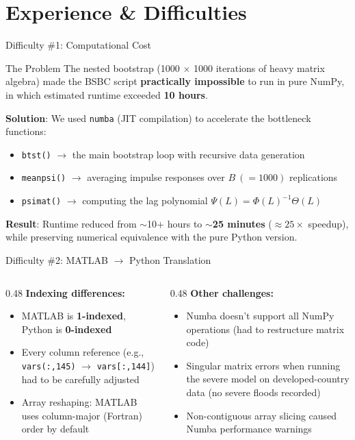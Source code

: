 \documentclass[10pt, aspectratio=169]{beamer}
\begin{document}
\section{Experience \& Difficulties}

\begin{frame}{Difficulty \#1: Computational Cost}
\begin{alertblock}{The Problem}
The nested bootstrap (1000 $\times$ 1000 iterations of heavy matrix algebra) made the BSBC script \textbf{practically impossible} to run in pure NumPy, in which estimated runtime exceeded \textbf{10 hours}.
\end{alertblock}

\vspace{0.3em}
\textbf{Solution}: We used \texttt{numba} (JIT compilation) to accelerate the bottleneck functions:
\begin{itemize}
    \item \texttt{btst()} $\rightarrow$ the main bootstrap loop with recursive data generation
    \item \texttt{meanpsi()} $\rightarrow$ averaging impulse responses over $B\ (=1000)$ replications
    \item \texttt{psimat()} $\rightarrow$ computing the lag polynomial $\Psi(L) = \Phi(L)^{-1}\Theta(L)$
\end{itemize}

\vspace{0.3em}
\textbf{Result}: Runtime reduced from $\sim$10+ hours to $\sim$\textbf{25 minutes} ($\approx 25\times$ speedup), while preserving numerical equivalence with the pure Python version.
\end{frame}

\begin{frame}{Difficulty \#2: MATLAB $\rightarrow$ Python Translation}
\begin{columns}
\begin{column}{0.48\textwidth}
\textbf{Indexing differences:}
\begin{itemize}
    \item MATLAB is \textbf{1-indexed}, Python is \textbf{0-indexed}
    \item Every column reference (e.g., \texttt{vars(:,145)} $\rightarrow$ \texttt{vars[:,144]}) had to be carefully adjusted
    \item Array reshaping: MATLAB uses column-major (Fortran) order by default
\end{itemize}
\end{column}
\begin{column}{0.48\textwidth}
\textbf{Other challenges:}
\begin{itemize}
    \item Numba doesn't support all NumPy operations (had to restructure matrix code)
    \item Singular matrix errors when running the severe model on developed-country data (no severe floods recorded)
    \item Non-contiguous array slicing caused Numba performance warnings
\end{itemize}
\end{column}
\end{columns}
\end{frame}
\end{document}
